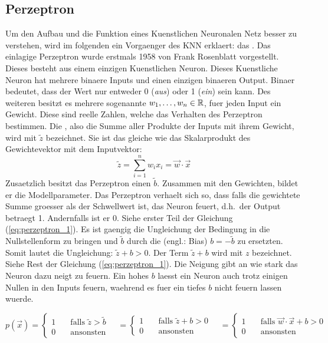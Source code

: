 \subsection{Perzeptron}
Um den Aufbau und die Funktion eines Kuenstlichen Neuronalen Netz besser zu
verstehen, wird im folgenden ein Vorgaenger des KNN erklaert: das .
\para{}
Das einlagige Perzeptron wurde erstmals 1958 von Frank Rosenblatt vorgestellt. Dieses
besteht aus einem einzigen Kuenstlichen Neuron. Dieses Kuenstliche Neuron
hat mehrere binaere Inputs und einen einzigen binaeren Output. Binaer
bedeutet, dass der Wert nur entweder 0 (\textit{aus}) oder 1 (\textit{ein}) sein
kann. Des weiteren besitzt es mehrere sogenannte  $w_1, \ldots,
w_n \in \mathbb{R}$, fuer jeden Input ein Gewicht.
Diese sind reelle Zahlen, welche das Verhalten des Perzeptron bestimmen.
Die , also die Summe aller Produkte der Inputs mit
ihrem Gewicht, wird mit $\tilde{z}$ bezeichnet.
Sie ist das gleiche wie das Skalarprodukt des Gewichtevektor mit dem Inputvektor:
\begin{equation*}
  \tilde{z} = \sum_{i=1}^{n} w_i x_i = \vec{w} \cdot \vec{x}
\end{equation*}
\para{}
Zusaetzlich besitzt das Perzeptron einen  $\tilde{b}$.
Zusammen mit den Gewichten, bildet er die Modellparameter.
Das Perzeptron verhaelt sich so, dass falls die gewichtete Summe groesser als der
Schwellwert ist, das Neuron feuert, d.h.\ der Output betraegt 1. Andernfalls ist er 0.
Siehe erster Teil der Gleichung (\ref{eq:perzeptron_1}).
Es ist gaengig die Ungleichung der Bedingung in die Nullstellenform zu bringen
und $\tilde{b}$ durch die  (engl.: Bias)
$b = -\tilde{b}$ zu ersetzten. Somit lautet die Ungleichung: $\tilde{z} + b
> 0$. Der Term $\tilde{z} + b$ wird mit $z$ bezeichnet. Siehe Rest der Gleichung (\ref{eq:perzeptron_1}).
Die Neigung gibt an wie stark das Neuron dazu neigt zu feuern. Ein hohes $b$
laesst ein Neuron auch trotz einigen Nullen in den Inputs feuern, waehrend es
fuer ein tiefes $b$ nicht feuern lassen wuerde.

\begin{equation}\label{eq:perzeptron_1}
  p(\vec{x}) =
  \begin{cases}
    1 & \quad \text{falls } \tilde{z} > \tilde{b}\\
    0 & \quad \text{ansonsten}
  \end{cases}
  \quad =
  \begin{cases}
    1 & \quad \text{falls } \tilde{z} + b > 0\\
    0 & \quad \text{ansonsten}
  \end{cases}
  \quad =
  \begin{cases}
    1 & \quad\text{falls } \vec{w} \cdot \vec{x} + b > 0\\
    0 & \quad\text{ansonsten}
  \end{cases}
\end{equation}

